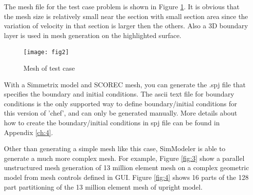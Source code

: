 \documentclass{article}
\begin{document}
The mesh file for the test case problem is shown in Figure \ref{fig:2}. It is obvious that the mesh size is relatively small near the section with small section area since the variation of velocity in that section is larger then the others. Also a 3D boundary layer is used in mesh generation on the highlighted surface. 

\begin{figure}[h!] 
\centering
\texttt{[image: fig2]}
\caption{Mesh of test case}
\label{fig:2}
\end{figure}

With a Simmetrix model and SCOREC mesh, you can generate the .spj file that specifies the boundary and initial conditions. The ascii text file for boundary conditions is the only supported way to define boundary/initial conditions for this version of 'chef', and can only be generated manually. More details about how to create the boundary/initial conditions in spj file can be found in Appendix \ref{ch:4}. 

Other than generating a simple mesh like this case, SimModeler is able to generate a much more complex mesh. For example, Figure \ref{fig:3} show a parallel unstructured mesh generation of 13 million element mesh on a complex geometric model from mesh controls defined in GUI. Figure \ref{fig:4} shows 16 parts of the 128 part partitioning of the 13 million element mesh of upright model.
\end{document}
